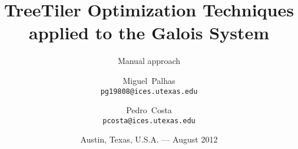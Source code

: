 

\titlehead{University of Texas%
\\%
\hfill Institute for Computational Engineering and Sciences%
\hfill Center for Distributed and Grid Computing}

\title{TreeTiler Optimization Techniques applied to the Galois System}

\subtitle{Manual approach}

\author{Miguel~Palhas\\\texttt{\smaller pg19808@ices.utexas.edu}%
\and Pedro~Costa\\\texttt{\smaller pcosta@ices.utexas.edu}%
}

\date{Austin, Texas, U.S.A. --- August 2012}

\subject{Summer Internship}